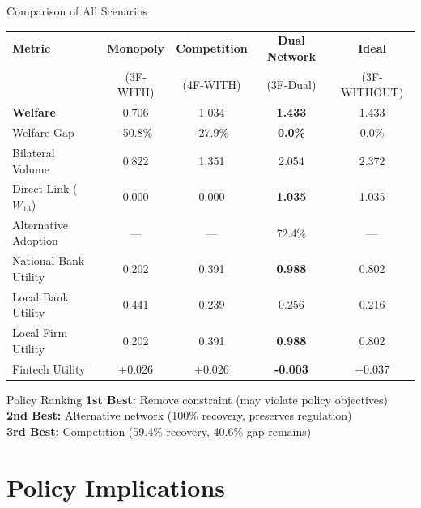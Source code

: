 \documentclass[aspectratio=169]{beamer}
\begin{document}
\begin{frame}{Comparison of All Scenarios}
    \begin{table}
        \centering
        \tiny
        \begin{tabular}{lcccc}
            \toprule
            \textbf{Metric} & \textbf{Monopoly} & \textbf{Competition} & \textbf{Dual Network} & \textbf{Ideal} \\
             & (3F-WITH) & (4F-WITH) & (3F-Dual) & (3F-WITHOUT) \\
            \midrule
            \textbf{Welfare} & 0.706 & 1.034 & \textbf{1.433} & 1.433 \\
            Welfare Gap & -50.8\% & -27.9\% & \textcolor{SafeGreen}{\textbf{0.0\%}} & 0.0\% \\
            \midrule
            Bilateral Volume & 0.822 & 1.351 & 2.054 & 2.372 \\
            Direct Link ($W_{13}$) & 0.000 & 0.000 & \textbf{1.035} & 1.035 \\
            Alternative Adoption & --- & --- & 72.4\% & --- \\
            \midrule
            National Bank Utility & 0.202 & 0.391 & \textbf{0.988} & 0.802 \\
            Local Bank Utility & 0.441 & 0.239 & 0.256 & 0.216 \\
            Local Firm Utility & 0.202 & 0.391 & \textbf{0.988} & 0.802 \\
            Fintech Utility & +0.026 & +0.026 & \textbf{-0.003} & +0.037 \\
            \bottomrule
        \end{tabular}
    \end{table}
    
    \vspace{0.3cm}
    \begin{block}{Policy Ranking}
        \textbf{1st Best:} Remove constraint (may violate policy objectives) \\
        \textbf{2nd Best:} Alternative network (100\% recovery, preserves regulation) \\
        \textbf{3rd Best:} Competition (59.4\% recovery, 40.6\% gap remains)
    \end{block}
\end{frame}

\section{Policy Implications}
\end{document}
